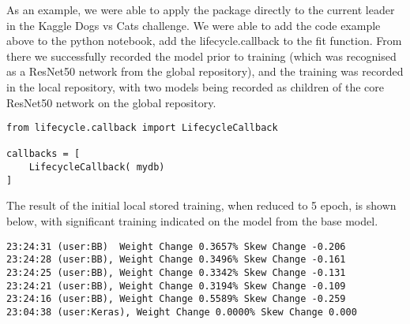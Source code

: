 As an example, we were able to apply the package directly to the current leader in the Kaggle Dogs vs Cats challenge\cite{golle_machine_2008}. We were able to add the code example above to the python notebook, add the lifecycle.callback to the fit function. From there we successfully recorded the model prior to training (which was recognised as a ResNet50 network from the global repository), and the training was recorded in the local repository, with two models being recorded as children of the core ResNet50 network on the global repository.

\begin{lstlisting}
from lifecycle.callback import LifecycleCallback

callbacks = [
    LifecycleCallback( mydb)
]
\end{lstlisting}

The result of the initial local stored training, when reduced to 5 epoch, is shown below, with significant training indicated on the model from the base model.


\begin{lstlisting}
23:24:31 (user:BB)  Weight Change 0.3657% Skew Change -0.206
23:24:28 (user:BB), Weight Change 0.3496% Skew Change -0.161
23:24:25 (user:BB), Weight Change 0.3342% Skew Change -0.131
23:24:21 (user:BB), Weight Change 0.3194% Skew Change -0.109
23:24:16 (user:BB), Weight Change 0.5589% Skew Change -0.259
23:04:38 (user:Keras), Weight Change 0.0000% Skew Change 0.000
\end{lstlisting}
